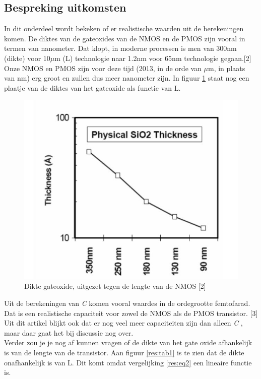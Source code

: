  \subsection{Bespreking uitkomsten}
 In dit onderdeel wordt bekeken of er realistische waarden uit  de berekeningen komen. De diktes van de gateoxides van de NMOS en de PMOS zijn  vooral in termen van nanometer. Dat klopt, in moderne processen is men van 300nm (dikte) voor 10$\mu$m (L) technologie naar 1.2nm voor 65nm technologie gegaan.[2] Onze NMOS en PMOS zijn voor deze tijd (2013, in de orde van $\mu$m, in plaats van nm) erg groot en zullen dus meer nanometer zijn. In figuur \ref{res:5} staat nog een plaatje van de diktes van het gateoxide als functie van L. 
\begin{figure} [h!]
  \includegraphics [scale = 0.3] {figures/sio2.jpg}
 \caption{Dikte gateoxide, uitgezet tegen de lengte van de NMOS [2]}
 \label{res:5}
\end{figure}
\newpage
Uit de berekeningen van \textit{C} komen vooral waardes in  de ordegrootte femtofarad. Dat is een realistische capaciteit voor zowel de NMOS als de PMOS transistor. [3] Uit dit artikel blijkt ook dat er nog veel meer capaciteiten zijn dan alleen \textit{C} , maar daar gaat het bij discussie nog over. \\
Verder zou je je nog af kunnen vragen of de dikte van het gate oxide afhankelijk is van de lengte van de transistor. Aan figuur \ref{res:tab1} is te zien dat de dikte onafhankelijk is van L. Dit komt omdat vergelijking \ref{res:eq2} een lineaire functie is. 

 

